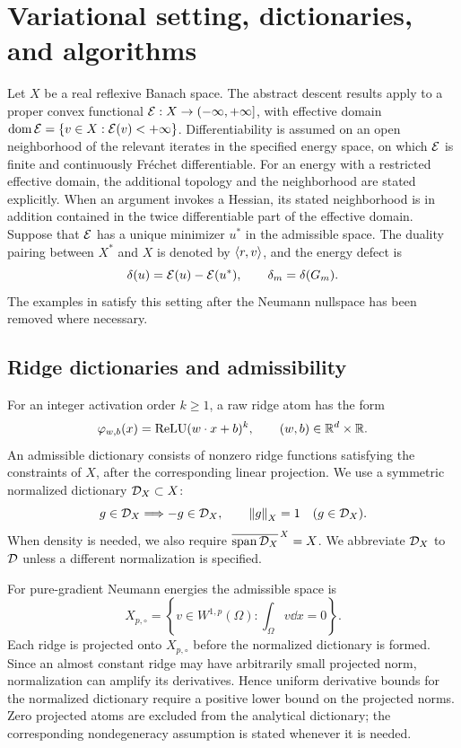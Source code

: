 \section{Variational setting, dictionaries, and algorithms}
\label{sec:setting}

Let \(X\) be a real reflexive Banach space. The abstract descent results apply to a proper convex
functional \(\mathcal{E}:X\to(-\infty,+\infty]\), with effective domain
\(\operatorname{dom}\mathcal{E}=\{v\in X:\mathcal{E}(v)<+\infty\}\).
Differentiability is assumed on an open neighborhood of the relevant iterates in the specified
energy space, on which \(\mathcal{E}\) is finite and continuously Fr\'echet differentiable. For an energy
with a restricted effective domain, the additional topology and the neighborhood are stated
explicitly. When an argument invokes a Hessian, its stated neighborhood is in addition contained in
the twice differentiable part of the effective domain. Suppose that \(\mathcal{E}\) has a unique minimizer
\(u^*\) in the admissible space. The duality pairing between \(X^*\) and \(X\) is denoted by
\(\left\langle r,v\right\rangle\), and the energy defect is
\[
  \delta(u)=\mathcal{E}(u)-\mathcal{E}(u^*), \qquad \delta_m=\delta(G_m).
\]
The examples in  satisfy this setting after the Neumann nullspace has been
removed where necessary.

\subsection{Ridge dictionaries and admissibility}

For an integer activation order \(k\geq1\), a raw ridge atom has the form
\[
  \varphi_{w,b}(x)=\operatorname{ReLU}(w\cdot x+b)^k,
  \qquad (w,b)\in\mathbb{R}^d\times\mathbb{R}.
\]
An admissible dictionary consists of nonzero ridge functions satisfying the constraints of \(X\),
after the corresponding linear projection. We use a symmetric normalized dictionary
\(\mathcal{D}_X\subset X\):
\[
g\in\mathcal{D}_X\Longrightarrow-g\in\mathcal{D}_X,\qquad \left\lVert g\right\rVert_X=1\quad(g\in\mathcal{D}_X).
\]
When density is needed, we also require \(\overline{\operatorname{span}\mathcal{D}_X}^{\,X}=X\).
We abbreviate \(\mathcal{D}_X\) to \(\mathcal{D}\) unless a different normalization is specified.

For pure-gradient Neumann energies the admissible space is
\[
  X_{p,\circ}=\left\{v\in W^{1,p}(\Omega):\int_\Omega v\dd x=0\right\}.
\]
Each ridge is projected onto $X_{p,\circ}$ before the normalized dictionary is formed.
Since an almost constant ridge may have arbitrarily small projected norm, normalization
can amplify its derivatives. Hence uniform derivative bounds for the normalized
dictionary require a positive lower bound on the projected norms. Zero projected
atoms are excluded from the analytical dictionary; the corresponding nondegeneracy
assumption is stated whenever it is needed.

